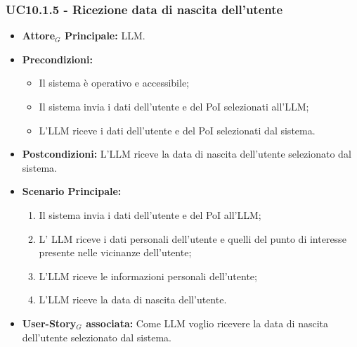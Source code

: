 \documentclass[11pt]{article}
\begin{document}
\begin{justify}
\subsubsection{\textbf{UC10.1.5 - Ricezione data di nascita dell'utente}}
\begin{itemize}
    \item \textbf{Attore$_G$ Principale:} LLM.
    \item \textbf{Precondizioni:} 
        \begin{itemize}
          \item Il sistema è operativo e accessibile;
          \item Il sistema invia i dati dell'utente e del PoI selezionati all'LLM;
            \item L'LLM riceve i dati dell'utente e del PoI selezionati dal sistema.
        \end{itemize}
      \item \textbf{Postcondizioni:} L'LLM riceve la data di nascita dell'utente selezionato dal sistema.
    \item \textbf{Scenario Principale:} 
        \begin{enumerate}
          \item Il sistema invia i dati dell'utente e del PoI all'LLM;
        \item L' LLM riceve i dati personali dell'utente e quelli del punto di interesse presente nelle vicinanze dell'utente;
          \item L'LLM riceve le informazioni personali dell'utente;
          \item L'LLM riceve la data di nascita dell'utente.
        \end{enumerate}
      \item \textbf{User-Story$_G$ associata:} Come LLM voglio ricevere la data di nascita dell'utente selezionato dal sistema.
\end{itemize}

\end{justify}
\end{document}
